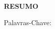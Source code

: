 \thispagestyle{empty}
\begin{Center}
    {\center \bf \MakeUppercase{resumo}}
\end{Center}
    
\begin{justify}
    \lipsum[100]
\end{justify}
{Palavras-Chave: \KEYWORDS}
\vspace*{\fill}
